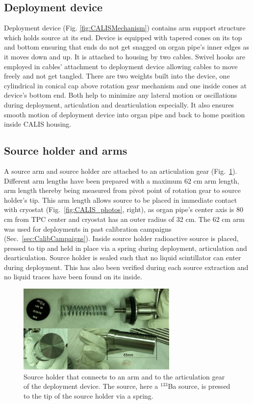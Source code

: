 \subsection{Deployment device}
Deployment device (Fig. \ref{fig:CALISMechanism}) contains arm support structure which holds source at its end. Device is equipped with tapered cones on its top and bottom ensuring that ends do not get snagged on organ pipe's inner edges as it moves down and up. It is attached to housing by two cables.  Swivel hooks are employed in cables' attachment to deployment device allowing cables to move freely and not get tangled. 
There are two weights built into the device, one cylindrical in conical cap above rotation gear mechanism and one inside cones at device's bottom end. Both help to minimize any lateral motion or oscillations during deployment, articulation and dearticulation especially. It also ensures smooth motion of deployment device into organ pipe and back to home position inside CALIS housing.

\subsection{Source holder and arms}
A source arm and source holder are attached to an articulation gear (Fig.~\ref{fig:SourceHolder}). Different arm lengths have been prepared with a maximum 62 cm arm length, arm length thereby being measured from pivot point of rotation gear to source holder's tip. This arm length allows source to be placed in immediate contact with cryostat (Fig.~\ref{fig:CALIS_photos}, right), as organ pipe's center axis is 80 cm from TPC center and cryostat has an outer radius of 32 cm. The 62 cm arm was used for deployments in past calibration campaigns (Sec.~\ref{sec:CalibCampaigns}). Inside source holder radioactive source is placed, pressed to tip and held in place via a spring during deployment, articulation and dearticulation. Source holder is sealed such that no liquid scintillator can enter during deployment. This has also been verified during each source extraction and no liquid traces have been found on its inside.

\begin{figure}[htbp]
 \centering
  \includegraphics[width=0.7\textwidth]{Figures/SourceHolder.png}
  \caption{Source holder that connects to an arm and to the articulation gear of the deployment device. The source, here a $^{133}$Ba source, is pressed to the tip of the source holder via a spring.}
  \label{fig:SourceHolder}
\end{figure}